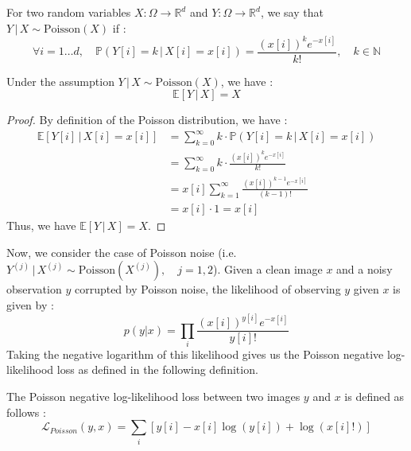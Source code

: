 \begin{definition}
    For two random variables $X: \Omega \to \mathbb{R}^d$ and $Y: \Omega \to \mathbb{R}^d$, we say that $Y \,|\, X \sim \text{Poisson}(X)$ if :
    \begin{equation*}
        \forall i = 1 \dots d, \quad \mathbb{P}(Y[i] = k \,|\, X[i] = x[i]) = \frac{(x[i])^k e^{-x[i]}}{k!}, \quad k \in \mathbb{N}
    \end{equation*}
\end{definition}

\begin{proposition}
    Under the assumption $Y \,|\, X \sim \text{Poisson}(X)$, we have :
    \begin{equation*}
        \mathbb{E}[Y \,|\, X] = X
    \end{equation*}
\end{proposition}

\begin{proof}
    By definition of the Poisson distribution, we have :
    \begin{align*}
        \mathbb{E}[Y[i] \,|\, X[i] = x[i]] &= \sum_{k=0}^{\infty} k \cdot \mathbb{P}(Y[i] = k \,|\, X[i] = x[i]) \\
        &= \sum_{k=0}^{\infty} k \cdot \frac{(x[i])^k e^{-x[i]}}{k!} \\
        &= x[i] \sum_{k=1}^{\infty} \frac{(x[i])^{k-1} e^{-x[i]}}{(k-1)!} \\
        &= x[i] \cdot 1 = x[i]
    \end{align*}
    Thus, we have $\mathbb{E}[Y \,|\, X] = X$.
\end{proof}

Now, we consider the case of Poisson noise (i.e. $Y^{(j)} \,|\, X^{(j)} \sim \text{Poisson}(X^{(j)}), \quad j = 1, 2$).
Given a clean image $x$ and a noisy observation $y$ corrupted by Poisson noise, the likelihood of observing $y$ given $x$ is given by :
\begin{equation*}
    p(y|x) = \prod_{i} \frac{(x[i])^{y[i]} e^{-x[i]}}{y[i]!}
\end{equation*}
Taking the negative logarithm of this likelihood gives us the Poisson negative log-likelihood loss as defined in the following definition.

\begin{definition}
    The Poisson negative log-likelihood loss between two images $y$ and $x$ is defined as follows :
    \begin{equation*}
        \mathcal{L}_{Poisson}(y, x) = \sum_{i} \left[ y[i] - x[i] \log(y[i]) + \log(x[i]!) \right]
    \end{equation*}
\end{definition}


